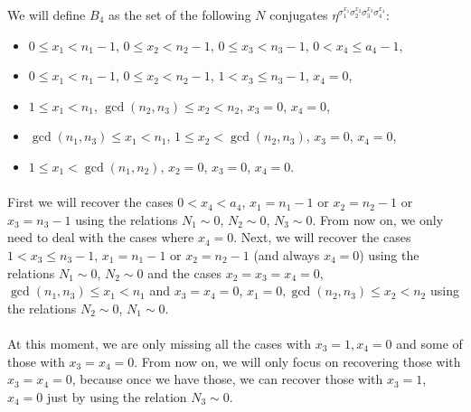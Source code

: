 We will define $B_4$ as the set of the following $N$ conjugates $\eta^{\sigma_1^{x_1}\sigma_2^{x_2}\sigma_3^{x_3}\sigma_4^{x_4}}$:
\begin{itemize}
\item $0\leq x_1<n_1-1$, $ 0\leq x_2<n_2-1$, $ 0\leq x_3<n_3-1$, $ 0<x_4\leq a_4-1$,
\item $0\leq x_1<n_1-1$, $ 0\leq x_2<n_2-1$, $ 1< x_3 \leq n_3-1$, $ x_4=0$,
\item $1\leq x_1< n_1$, $ \gcd(n_2,n_3)\leq x_2<n_2$, $ x_3=0$, $ x_4=0$,
\item $\gcd(n_1,n_3)\leq x_1< n_1$, $ 1\leq x_2<\gcd(n_2,n_3)$, $x_3=0$, $ x_4=0$,
\item $1\leq x_1 <\gcd(n_1,n_2)$, $ x_2=0$, $ x_3=0$, $ x_4=0$.
\end{itemize}

\paragraph*{}
First we will recover the cases $0<x_4<a_4$, $x_1=n_1-1$ or $x_2=n_2-1$ or $x_3=n_3-1$ using the relations $N_1\sim 0$, $N_2\sim 0$, $N_3\sim 0$. From now on, we only need to deal with the cases where $x_4=0$. Next, we will recover the cases $1< x_3 \leq n_3-1$, $x_1=n_1-1$ or $x_2=n_2-1$ (and always $x_4=0$) using the relations $N_1\sim 0$, $N_2\sim 0$ and the cases $x_2=x_3=x_4=0$, $\gcd(n_1,n_3)\leq x_1< n_1$ and $x_3=x_4=0$, $x_1=0, \gcd(n_2,n_3)\leq x_2<n_2$ using the relations $N_2\sim 0$, $N_1\sim 0$.
\paragraph*{}
At this moment, we are only missing all the cases with $x_3=1,x_4=0$ and some of those with $x_3=x_4=0$. From now on, we will only focus on recovering those with $x_3=x_4=0$, because once we have those, we can recover those with $x_3=1$, $x_4=0$ just by using the relation $N_3\sim 0$.

